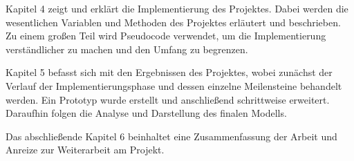 Kapitel 4 zeigt und erklärt die Implementierung des Projektes. Dabei werden die wesentlichen Variablen und Methoden des Projektes erläutert und beschrieben. Zu einem großen Teil wird Pseudocode verwendet, um die Implementierung verständlicher zu machen und den Umfang zu begrenzen.

Kapitel 5 befasst sich mit den Ergebnissen des Projektes, wobei zunächst der Verlauf der Implementierungsphase und dessen einzelne Meilensteine behandelt werden. Ein Prototyp wurde erstellt und anschließend schrittweise erweitert. Daraufhin folgen die Analyse und Darstellung des finalen Modells.

Das abschließende Kapitel 6 beinhaltet eine Zusammenfassung der Arbeit und Anreize zur Weiterarbeit am Projekt.